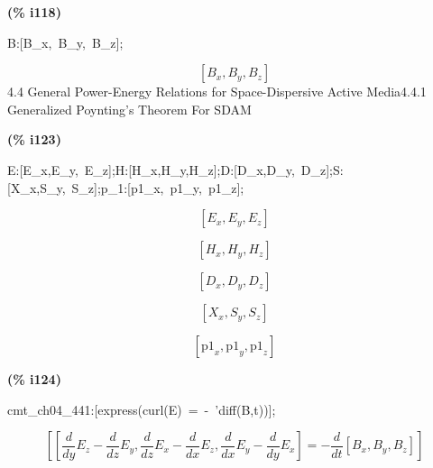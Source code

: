 \documentclass[fleqn]{article}
\begin{document}
\noindent
\begin{minipage}[t]{4.000000em}\color{red}\bfseries
(\% i118)	
\end{minipage}
\begin{minipage}[t]{\textwidth}\color{blue}
B:[B\_x,\ B\_y,\ B\_z];
\end{minipage}
\[\displaystyle \tag{\% o118} 
\left[ {B_x}\operatorname{,}{B_y}\operatorname{,}{B_z}\right] \mbox{}
\]
4.4 General Power-Energy Relations for Space-Dispersive Active Media4.4.1 Generalized Poynting's Theorem For SDAM


\noindent
\begin{minipage}[t]{4.000000em}\color{red}\bfseries
(\% i123)	
\end{minipage}
\begin{minipage}[t]{\textwidth}\color{blue}
E:[E\_x,E\_y,\ E\_z];H:[H\_x,H\_y,H\_z];D:[D\_x,D\_y,\ D\_z];S:[X\_x,S\_y,\ S\_z];p\_1:[p1\_x,\ p1\_y,\ p1\_z];
\end{minipage}
\[\displaystyle \tag{\% o119} 
\left[ {E_x}\operatorname{,}{E_y}\operatorname{,}{E_z}\right] \mbox{}\]

\[\tag{\% o120} 
\left[ {H_x}\operatorname{,}{H_y}\operatorname{,}{H_z}\right] \mbox{}\]

\[\tag{\% o121} 
\left[ {D_x}\operatorname{,}{D_y}\operatorname{,}{D_z}\right] \mbox{}\]

\[\tag{\% o122} 
\left[ {X_x}\operatorname{,}{S_y}\operatorname{,}{S_z}\right] \mbox{}\]

\[\tag{\% o123} 
\left[ {{\ensuremath{\mathrm{p1}}}_x}\operatorname{,}{{\ensuremath{\mathrm{p1}}}_y}\operatorname{,}{{\ensuremath{\mathrm{p1}}}_z}\right] \mbox{}
\]


\noindent
\begin{minipage}[t]{4.000000em}\color{red}\bfseries
(\% i124)	
\end{minipage}
\begin{minipage}[t]{\textwidth}\color{blue}
cmt\_ch04\_441:[express(curl(E)\ =\ -\ 'diff(B,t))];
\end{minipage}
\[\displaystyle \tag{\% o124} 
\left[ \left[ \frac{d}{d y} {E_z}-\frac{d}{d z} {E_y}\operatorname{,}\frac{d}{d z} {E_x}-\frac{d}{d x} {E_z}\operatorname{,}\frac{d}{d x} {E_y}-\frac{d}{d y} {E_x}\right] =-\frac{d}{d t} \left[ {B_x}\operatorname{,}{B_y}\operatorname{,}{B_z}\right] \right] \mbox{}
\]
\end{document}

